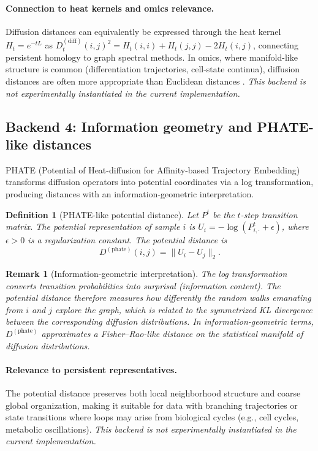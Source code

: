 \documentclass[11pt]{article}
\newtheorem{definition}[theorem]{Definition}
\newtheorem{remark}[theorem]{Remark}
\begin{document}
\paragraph{Connection to heat kernels and omics relevance.}
Diffusion distances can equivalently be expressed through the heat kernel $H_t = e^{-tL}$ as $D^{(\text{diff})}_t(i,j)^2 = H_t(i,i) + H_t(j,j) - 2H_t(i,j)$, connecting persistent homology to graph spectral methods.
In omics, where manifold-like structure is common (differentiation trajectories, cell-state continua), diffusion distances are often more appropriate than Euclidean distances \cite{coifman2006diffusion, haghverdi2016}.
\emph{This backend is not experimentally instantiated in the current implementation.}

\subsection{Backend 4: Information geometry and PHATE-like distances}
\label{sec:phate}

PHATE (Potential of Heat-diffusion for Affinity-based Trajectory Embedding) \cite{moon2019phate} transforms diffusion operators into potential coordinates via a log transformation, producing distances with an information-geometric interpretation.

\begin{definition}[PHATE-like potential distance]
Let $P^t$ be the $t$-step transition matrix.
The \emph{potential representation} of sample $i$ is $U_i = -\log(P^t_{i,\cdot} + \epsilon)$, where $\epsilon > 0$ is a regularization constant.
The \emph{potential distance} is
\[
D^{(\text{phate})}(i,j) = \|U_i - U_j\|_2.
\]
\end{definition}

\begin{remark}[Information-geometric interpretation]
The log transformation converts transition probabilities into surprisal (information content).
The potential distance therefore measures how differently the random walks emanating from $i$ and $j$ explore the graph, which is related to the symmetrized KL divergence between the corresponding diffusion distributions.
In information-geometric terms, $D^{(\text{phate})}$ approximates a Fisher--Rao-like distance on the statistical manifold of diffusion distributions.
\end{remark}

\paragraph{Relevance to persistent representatives.}
The potential distance preserves both local neighborhood structure and coarse global organization, making it suitable for data with branching trajectories or state transitions where loops may arise from biological cycles (e.g., cell cycles, metabolic oscillations).
\emph{This backend is not experimentally instantiated in the current implementation.}
\end{document}
